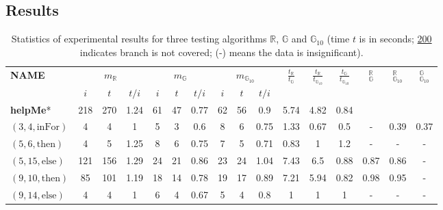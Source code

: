 \documentclass[sigconf,review,anonymous]{acmart}
\newcommand{\thenBr}{\text{then}}
\newcommand{\elseBr}{\text{else}}
\newcommand{\inFor}{\text{inFor}}
\newcommand{\Random}{\mathbb{R}}
\newcommand{\Genetic}{\mathbb{G}}
\newcommand{\RGenetic}{\mathbb{G}_{10}}
\begin{document}
\subsection{Results}
\label{sub.sec.eval.results}

\setlength\tabcolsep{.98pt}
\begin{table}[!t]
  \caption{Statistics of experimental results for three testing algorithms $\Random$, $\Genetic$ and $\RGenetic$ (time $t$ is in seconds; \underline{200} indicates branch is not covered; (-) means the data is insignificant).}
  \label{tbl.stats}
    \scriptsize
    \begin{tabular}{l|ccc|ccc|ccc|ccc|ccc}
      \toprule
      \multirow{2}{*}{\textbf{NAME}} &   \multicolumn{3}{c|}{$m_{\Random}$} & \multicolumn{3}{c|}{$m_{\Genetic}$} & \multicolumn{3}{c|}{$m_{\RGenetic}$} & \multirow{2}{*}{$\frac{t_{\Random}}{t_{\Genetic}}$} &  \multirow{2}{*}{$\frac{t_{\Random}}{t_{\RGenetic}}$} & \multirow{2}{*}{$\frac{t_{\Genetic}}{t_{\RGenetic}}$}   & \multirow{2}{*}{\hfil $_{\Genetic}^{\Random}$} &  \multirow{2}{*}{\hfil $_{\RGenetic}^{\Random}$} & \multirow{2}{*}{\hfil $_{\RGenetic}^{\Genetic}$} \\
      \cline{2-10} %
                             & $i$      & $t$  & $t/i$     & $i$& $t$&$t/i$             &$i$ &$t$ &$t/i$               &      &       &        &      &       &      \\
      \midrule
    \textbf{helpMe}*         & 218      & 270  & 1.24      & 61 & 47 & 0.77             & 62 & 56 & 0.9                & 5.74 & 4.82  & 0.84   &      &      &       \\
    $(3,4,\inFor)$           & 4        & 4    & 1         & 5  & 3  & 0.6              & 8  & 6  & 0.75               & 1.33 & 0.67  & 0.5    & - & 0.39 & 0.37  \\
    $(5,6,\thenBr)$          & 4        & 5    & 1.25      & 8  & 6  & 0.75             & 7  & 5  & 0.71               & 0.83 & 1     & 1.2    & - & -  & -  \\
    $(5,15,\elseBr)$         & 121      & 156  & 1.29      & 24 & 21 & 0.86             & 23 & 24 & 1.04               & 7.43 & 6.5   & 0.88   & 0.87 & 0.86 & -  \\
    $(9,10,\thenBr)$         & 85       & 101  & 1.19      & 18 & 14 & 0.78             & 19 & 17 & 0.89               & 7.21 & 5.94  & 0.82   & 0.98 & 0.95 & -  \\
    $(9,14,\elseBr)$         & 4        & 4    & 1         & 6  & 4  & 0.67             & 5  & 4  & 0.8                & 1    & 1     & 1      & - & - & -  \\

\end{tabular}
\end{table}
\end{document}

